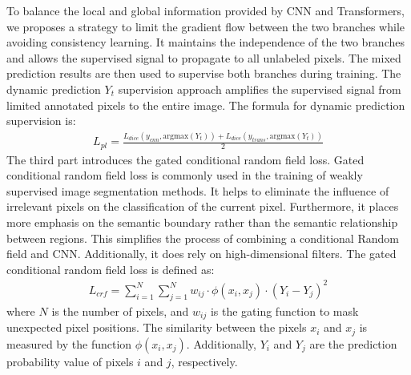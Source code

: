 \documentclass[sigconf,natbib=false]{acmart}
\begin{document}
To balance the local and global information provided by CNN and Transformers, we proposes a strategy to limit the gradient flow between the two branches while avoiding consistency learning. It maintains the independence of the two branches and allows the supervised signal to propagate to all unlabeled pixels. The mixed prediction results are then used to supervise both branches during training. The dynamic prediction $Y_t$ supervision approach amplifies the supervised signal from limited annotated pixels to the entire image. The formula for dynamic prediction supervision is:
\begin{eqnarray}
L_{pl} = \frac{L_{dice}\left(y_{cnn}, \mathrm{argmax}(Y_t)\right) + L_{dice}\left(y_{trans}, \mathrm{argmax}(Y_t)\right)}{2}
\end{eqnarray}
The third part introduces the gated conditional random field loss. Gated conditional random field loss is commonly used in the training of weakly supervised image segmentation methods. It helps to eliminate the influence of irrelevant pixels on the classification of the current pixel. Furthermore, it places more emphasis on the semantic boundary rather than the semantic relationship between regions. This simplifies the process of combining a conditional Random field and CNN. Additionally, it does rely on high-dimensional filters. The gated conditional random field loss is defined as:
\begin{eqnarray}
L_{crf} = \sum_{i = 1}^{N} \sum_{j = 1}^{N} w_{ij} \cdot \phi(x_i, x_j) \cdot (Y_i - Y_j)^2
\end{eqnarray}
where $N$ is the number of pixels, and $w_{ij} $ is the gating function to mask unexpected pixel positions.  The similarity between the pixels $x_i$ and $x_j$ is measured by the function $\phi(x_i, x_j)$. Additionally, $Y_i$ and $Y_j$ are the prediction probability value of pixels $i$ and $j$, respectively.
\end{document}
